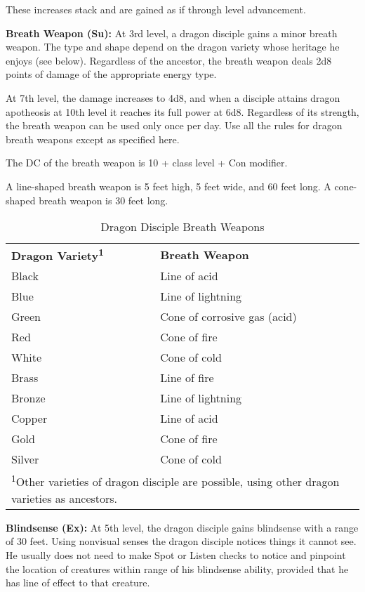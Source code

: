 These increases stack and are gained as if through level advancement.

\textbf{Breath Weapon (Su):} At 3rd level, a dragon disciple gains a minor breath 
weapon. The type and shape depend on the dragon variety whose heritage he enjoys 
(see below). Regardless of the ancestor, the breath weapon deals 2d8 points of 
damage of the appropriate energy type.

At 7th level, the damage increases to 4d8, and when a disciple attains dragon apotheosis 
at 10th level it reaches its full power at 6d8. Regardless of its strength, the 
breath weapon can be used only once per day. Use all the rules for dragon breath 
weapons except as specified here.

The DC of the breath weapon is 10 + class level + Con modifier.

A line-shaped breath weapon is 5 feet high, 5 feet wide, and 60 feet long. A cone-shaped 
breath weapon is 30 feet long.

\begin{table}[htb]
\mcinherit
\caption{Dragon Disciple Breath Weapons}
\centering
\begin{tabular}{l l}
\textbf{Dragon Variety\textsuperscript{1}} & \textbf{Breath Weapon}\\
Black & Line of acid\\
Blue & Line of lightning\\
Green & Cone of corrosive gas (acid)\\
Red & Cone of fire\\
White & Cone of cold\\
Brass & Line of fire\\
Bronze & Line of lightning\\
Copper & Line of acid\\
Gold & Cone of fire\\
Silver & Cone of cold\\
\multicolumn{2}{p{7cm}}{\textsuperscript{1}Other varieties of dragon disciple are possible, using other dragon varieties as ancestors.}\\
\end{tabular}
\end{table}

\textbf{Blindsense (Ex):} At 5th level, the dragon disciple gains blindsense with 
a range of 30 feet. Using nonvisual senses the dragon disciple notices things it 
cannot see. He usually does not need to make Spot or Listen checks to notice and 
pinpoint the location of creatures within range of his blindsense ability, provided 
that he has line of effect to that creature.

